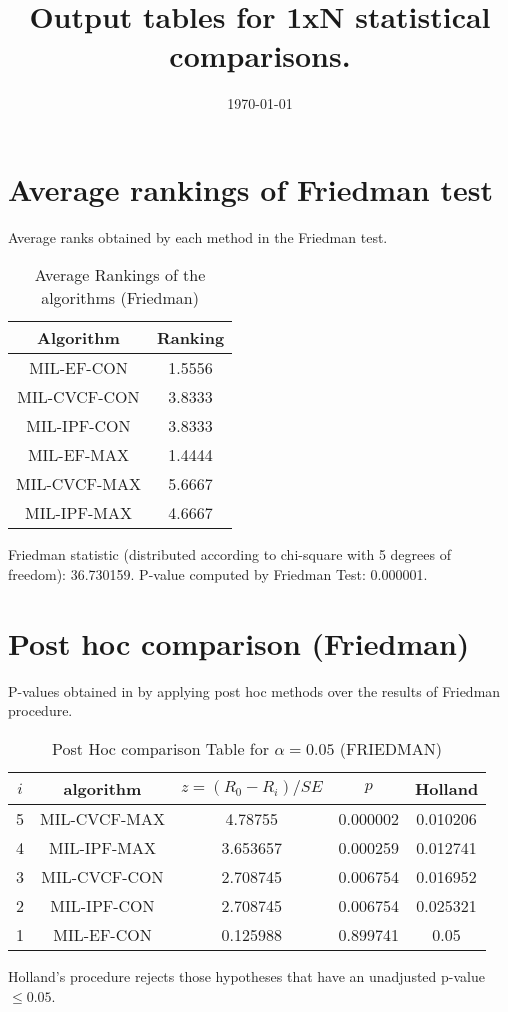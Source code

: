 \documentclass[a4paper,10pt]{article}
\title{Output tables for 1xN statistical comparisons.}
\author{}
\date{\today}
\begin{document}
\begin{landscape}
\pagestyle{empty}
\maketitle
\thispagestyle{empty}

\section{Average rankings of Friedman test}


Average ranks obtained by each method in the Friedman test.

\begin{table}[!htp]
\centering
\begin{tabular}{|c|c|}\hline
Algorithm&Ranking\\\hline
MIL-EF-CON&1.5556\\MIL-CVCF-CON&3.8333\\MIL-IPF-CON&3.8333\\MIL-EF-MAX&1.4444\\MIL-CVCF-MAX&5.6667\\MIL-IPF-MAX&4.6667\\\hline\end{tabular}
\caption{Average Rankings of the algorithms (Friedman)}
\end{table}

Friedman statistic (distributed according to chi-square with 5 degrees of freedom): 36.730159. \newline P-value computed by Friedman Test: 0.000001.\newline


\newpage

\section{Post hoc comparison (Friedman)}


P-values obtained in by applying post hoc methods over the results of Friedman procedure.

\begin{table}[!htp]
\centering\footnotesize
\begin{tabular}{ccccc}
$i$&algorithm&$z=(R_0 - R_i)/SE$&$p$&Holland\\
\hline5&MIL-CVCF-MAX&4.78755&0.000002&0.010206\\4&MIL-IPF-MAX&3.653657&0.000259&0.012741\\3&MIL-CVCF-CON&2.708745&0.006754&0.016952\\2&MIL-IPF-CON&2.708745&0.006754&0.025321\\1&MIL-EF-CON&0.125988&0.899741&0.05\\\hline
\end{tabular}
\caption{Post Hoc comparison Table for $\alpha=0.05$ (FRIEDMAN)}
\end{table}Holland's procedure rejects those hypotheses that have an unadjusted p-value $\le0.05$.



\end{landscape}
\end{document}
